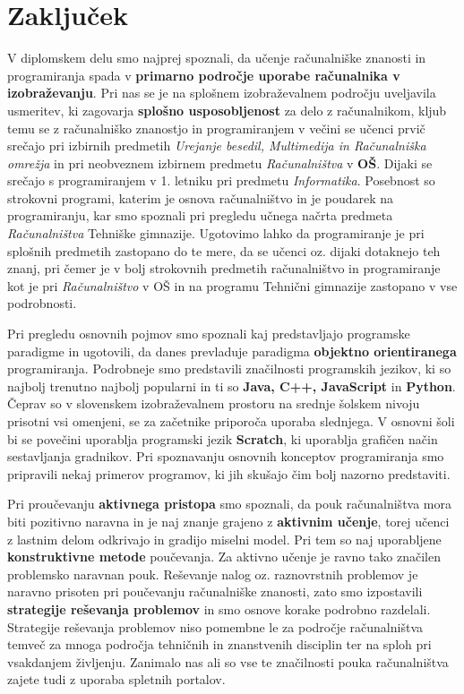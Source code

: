 \section{Zaključek}
\label{sec:zakljuek}

V diplomskem delu smo najprej spoznali, da učenje računalniške
znanosti in programiranja spada v \textbf{primarno področje uporabe
  računalnika v izobraževanju}. Pri nas se je na splošnem
izobraževalnem področju uveljavila usmeritev, ki zagovarja
\textbf{splošno usposobljenost} za delo z računalnikom, kljub temu se
z računalniško znanostjo in programiranjem v večini se učenci prvič
srečajo pri izbirnih predmetih \emph{Urejanje besedil, Multimedija in
  Računalniška omrežja} in pri neobveznem izbirnem predmetu
\emph{Računalništva} v \textbf{OŠ}. Dijaki se srečajo s programiranjem
v 1. letniku pri predmetu \emph{Informatika}. Posebnost so strokovni
programi, katerim je osnova računalništvo in je poudarek na
programiranju, kar smo spoznali pri pregledu učnega načrta predmeta
\emph{Računalništva} Tehniške gimnazije. Ugotovimo lahko da
programiranje je pri splošnih predmetih zastopano do te mere, da se
učenci oz. dijaki dotaknejo teh znanj, pri čemer je v bolj strokovnih
predmetih računalništvo in programiranje kot je pri
\emph{Računalništvo} v OŠ in na programu Tehnični gimnazije zastopano
v vse podrobnosti.

Pri pregledu osnovnih pojmov smo spoznali kaj predstavljajo programske
paradigme in ugotovili, da danes prevladuje paradigma \textbf{objektno
  orientiranega} programiranja. Podrobneje smo predstavili značilnosti
programskih jezikov, ki so najbolj trenutno najbolj popularni in ti so
\textbf{Java, C++, JavaScript} in \textbf{Python}. Čeprav so v
slovenskem izobraževalnem prostoru na srednje šolskem nivoju prisotni
vsi omenjeni, se za začetnike priporoča uporaba slednjega. V osnovni
šoli bi se povečini uporablja programski jezik \textbf{Scratch}, ki
uporablja grafičen način sestavljanja gradnikov. Pri spoznavanju
osnovnih konceptov programiranja smo pripravili nekaj primerov
programov, ki jih skušajo čim bolj nazorno predstaviti.

Pri proučevanju \textbf{aktivnega pristopa} smo spoznali, da pouk
računalništva mora biti pozitivno naravna in je naj znanje grajeno z
\textbf{aktivnim učenje}, torej učenci z lastnim delom odkrivajo in
gradijo miselni model. Pri tem so naj uporabljene
\textbf{konstruktivne metode} poučevanja. Za aktivno učenje je ravno
tako značilen problemsko naravnan pouk. Reševanje nalog
oz. raznovrstnih problemov je naravno prisoten pri poučevanju
računalniške znanosti, zato smo izpostavili \textbf{strategije
  reševanja problemov} in smo osnove korake podrobno
razdelali. Strategije reševanja problemov niso pomembne le za področje
računalništva temveč za mnoga področja tehničnih in znanstvenih
disciplin ter na sploh pri vsakdanjem življenju. Zanimalo nas ali so
vse te značilnosti pouka računalništva zajete tudi z uporaba spletnih
portalov.

